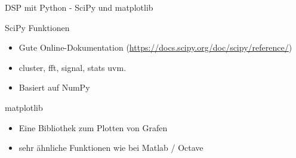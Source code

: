\documentclass[8pt]{beamer}
\begin{document}
\begin{frame}[label={sec:orgdb8698f}]{DSP mit Python - SciPy und matplotlib}
\begin{block}{SciPy Funktionen}
\begin{itemize}
\item Gute Online-Dokumentation (\url{https://docs.scipy.org/doc/scipy/reference/})
\item cluster, fft, signal, stats uvm.
\item Basiert auf NumPy
\end{itemize}
\end{block}

\begin{block}{matplotlib}
\begin{itemize}
\item Eine Bibliothek zum Plotten von Grafen
\item sehr ähnliche Funktionen wie bei Matlab / Octave
\end{itemize}
\end{block}
\end{frame}
\end{document}
